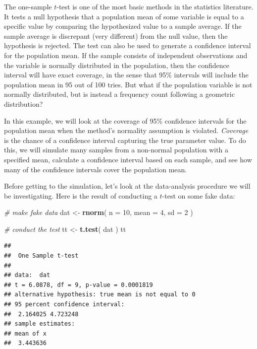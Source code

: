 \documentclass[
]{book}
\newenvironment{Shaded}{\begin{snugshade}}{\end{snugshade}}
\newcommand{\AttributeTok}[1]{\textcolor[rgb]{0.13,0.29,0.53}{#1}}
\newcommand{\CommentTok}[1]{\textcolor[rgb]{0.56,0.35,0.01}{\textit{#1}}}
\newcommand{\DecValTok}[1]{\textcolor[rgb]{0.00,0.00,0.81}{#1}}
\newcommand{\FunctionTok}[1]{\textcolor[rgb]{0.13,0.29,0.53}{\textbf{#1}}}
\newcommand{\NormalTok}[1]{#1}
\newcommand{\OtherTok}[1]{\textcolor[rgb]{0.56,0.35,0.01}{#1}}
\begin{document}
The one-sample \(t\)-test is one of the most basic methods in the statistics literature.
It tests a null hypothesis that a population mean of some variable is equal to a specific value by comparing the hypothesized value to a sample average.
If the sample average is discrepant (very different) from the null value, then the hypothesis is rejected.
The test can also be used to generate a confidence interval for the population mean.
If the sample consists of independent observations and the variable is normally distributed in the population, then the confidence interval will have exact coverage, in the sense that 95\% intervals will include the population mean in 95 out of 100 tries.
But what if the population variable is not normally distributed, but is instead a frequency count following a geometric distribution?

In this example, we will look at the coverage of 95\% confidence intervals for the population mean when the method's normality assumption is violated.
\emph{Coverage} is the chance of a confidence interval capturing the true parameter value.
To do this, we will simulate many samples from a non-normal population with a specified mean, calculate a confidence interval based on each sample, and see how many of the confidence intervals cover the population mean.

Before getting to the simulation, let's look at the data-analysis procedure we will be investigating.
Here is the result of conducting a \(t\)-test on some fake data:

\begin{Shaded}
\begin{Highlighting}[]
\CommentTok{\# make fake data}
\NormalTok{dat }\OtherTok{\textless{}{-}} \FunctionTok{rnorm}\NormalTok{( }\AttributeTok{n =} \DecValTok{10}\NormalTok{, }\AttributeTok{mean =} \DecValTok{4}\NormalTok{, }\AttributeTok{sd =} \DecValTok{2}\NormalTok{ )}

\CommentTok{\# conduct the test}
\NormalTok{tt }\OtherTok{\textless{}{-}} \FunctionTok{t.test}\NormalTok{( dat )}
\NormalTok{tt}
\end{Highlighting}
\end{Shaded}

\begin{verbatim}
## 
##  One Sample t-test
## 
## data:  dat
## t = 6.0878, df = 9, p-value = 0.0001819
## alternative hypothesis: true mean is not equal to 0
## 95 percent confidence interval:
##  2.164025 4.723248
## sample estimates:
## mean of x 
##  3.443636
\end{verbatim}
\end{document}
